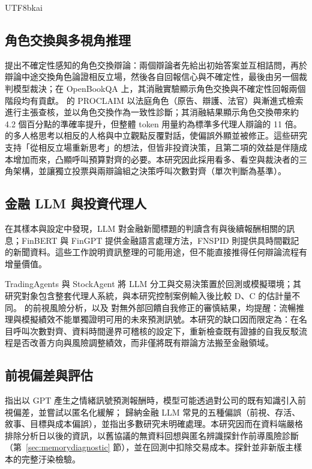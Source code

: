 \documentclass[12pt,a4paper]{article}
\newcommand{\grp}[1]{\textsf{#1}}
\begin{document}
\begin{CJK}{UTF8}{bkai}
\subsection{角色交換與多視角推理}

\citet{liu2025roleswitch} 提出不確定性感知的角色交換辯論：兩個辯論者先給出初始答案並互相詰問，再於辯論中途交換角色論證相反立場，然後各自回報信心與不確定性，最後由另一個裁判模型裁決；在 OpenBookQA 上，其消融實驗顯示角色交換與不確定性回報兩個階段均有貢獻。\citet{chowdhury2026proclaim} 的 PROCLAIM 以法庭角色（原告、辯護、法官）與漸進式檢索進行主張查核，並以角色交換作為一致性診斷；其消融結果顯示角色交換帶來約 4.2 個百分點的準確率提升，但整體 token 用量約為標準多代理人辯論的 11 倍。\citet{chen2026mpt} 的多人格思考以相反的人格與中立觀點反覆對話，使偏誤外顯並被修正。這些研究支持「從相反立場重新思考」的想法，但皆非投資決策，且第二項的效益是伴隨成本增加而來，凸顯呼叫預算對齊的必要。本研究因此採用看多、看空與裁決者的三角架構，並讓獨立投票與兩辯論組之決策呼叫次數對齊（單次判斷為基準）。

\subsection{金融 LLM 與投資代理人}

\citet{lopezlira2023chatgpt} 在其樣本與設定中發現，LLM 對金融新聞標題的判讀含有與後續報酬相關的訊息；FinBERT \citep{araci2019finbert} 與 FinGPT \citep{liu2023fingpt} 提供金融語言處理方法，FNSPID \citep{dong2024fnspid} 則提供具時間戳記的新聞資料。這些工作說明資訊整理的可能用途，但不能直接推得任何辯論流程有增量價值。

TradingAgents \citep{xiao2024tradingagents} 與 StockAgent \citep{zhang2024stockagent} 將 LLM 分工與交易決策置於回測或模擬環境；其研究對象包含整套代理人系統，與本研究控制案例輸入後比較 \grp{D}、\grp{C} 的估計量不同。\citet{glasserman2023lookahead} 的前視風險分析，以及 \citet{huang2024selfcorrect} 對無外部回饋自我修正的審慎結果，均提醒：流暢推理與模擬績效不能單獨證明可用的未來預測訊號。本研究的缺口因而限定為：在名目呼叫次數對齊、資料時間邊界可稽核的設定下，重新檢查既有證據的自我反駁流程是否改善方向與風險調整績效，而非僅將既有辯論方法搬至金融領域。

\subsection{前視偏差與評估}

\citet{glasserman2023lookahead} 指出以 GPT 產生之情緒訊號預測報酬時，模型可能透過對公司的既有知識引入前視偏差，並嘗試以匿名化緩解；\citet{kong2026bias} 歸納金融 LLM 常見的五種偏誤（前視、存活、敘事、目標與成本偏誤），並指出多數研究未明確處理。本研究因而在資料端嚴格排除分析日以後的資訊，以舊協議的無資料回想與匿名辨識探針作前導風險診斷（第~\ref{sec:memorydiagnostic} 節），並在回測中扣除交易成本。探針並非新版主樣本的完整汙染檢驗。


\end{CJK}
\end{document}

